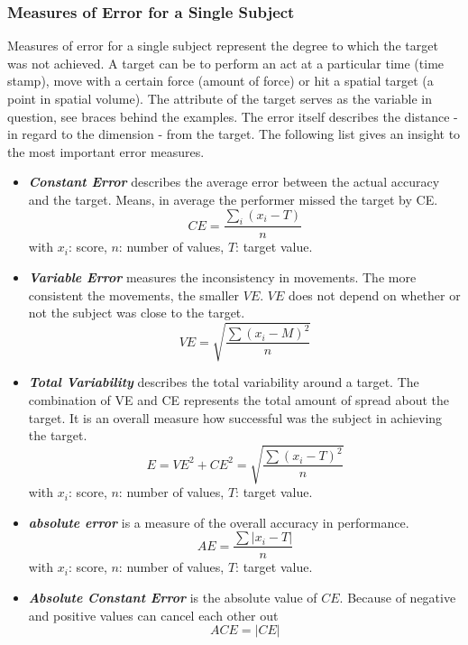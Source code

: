 \subsubsection{Measures of Error for a Single Subject}
Measures of error for a single subject represent the degree to which the target was not achieved. A target can be to perform an act at a particular time (time stamp), move with a certain force (amount of force) or hit a spatial target (a point in spatial volume). The attribute of the target serves as the variable in question, see braces behind the examples. The error itself describes the distance - in regard to the dimension - from the target. The following list gives an insight to the most important error measures.
\begin{itemize}
	\item \textbf{\textit{Constant Error}} describes the average error between the actual accuracy and the target. Means, in average the performer missed the target by CE.
	\begin{equation}
		CE=\frac{\sum_i(x_i-T)}{n}
	\end{equation}
	\label{eq:constanterror}
	with $x_i$: score, $n$: number of values, $T$: target value.
	\item \textbf{\textit{Variable Error}} measures the inconsistency in movements. The more consistent the movements, the smaller $VE$. $VE$ does not depend on whether or not the subject was close to the target.
	\begin{equation}
		VE=\sqrt{\frac{\sum(x_i-M)^2}{n}}	
	\end{equation}
	\item \textbf{\textit{Total Variability}} describes the total variability around a target. The combination of VE and CE represents the total amount of spread about the target. It is an overall measure how successful was the subject in achieving the target.
	\begin{equation}
		E=VE^2+CE^2=\sqrt{\frac{\sum(x_i-T)^2}{n}}
	\end{equation}
	with $x_i$: score, $n$: number of values, $T$: target value.
	\item \textbf{\textit{absolute error}} is a measure of the overall accuracy in performance.
	\begin{equation}
		AE=\frac{\sum|x_i-T|}{n}
	\end{equation}
	with $x_i$: score, $n$: number of values, $T$: target value.
	\item \textbf{\textit{Absolute Constant Error}} is the absolute value of $CE$. Because of negative and positive values can cancel each other out
	\begin{equation}
		ACE = |CE|
	\end{equation}
\end{itemize}



